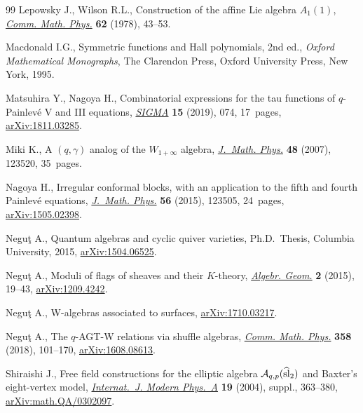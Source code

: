 \documentclass[pdftex]{sigma}
\numberwithin{equation}{section}
\theoremstyle{definition}
\begin{document}
\begin{thebibliography}{99}
Lepowsky J., Wilson R.L., Construction of the affine {L}ie algebra
 {$A_{1}^{{}}(1)$}, \href{https://doi.org/10.1007/BF01940329}{\textit{Comm. Math. Phys.}} \textbf{62} (1978), 43--53.

Macdonald I.G., Symmetric functions and {H}all polynomials, 2nd ed., \textit{Oxford
 Mathematical Monographs}, The Clarendon Press, Oxford University Press, New
 York, 1995.

Matsuhira Y., Nagoya H., Combinatorial expressions for the tau functions of
 {$q$}-{P}ainlev\'e {V} and {III} equations, \href{https://doi.org/10.3842/SIGMA.2019.074}{\textit{SIGMA}} \textbf{15}
 (2019), 074, 17~pages, \href{https://arxiv.org/abs/1811.03285}{arXiv:1811.03285}.

Miki K., A {$(q,\gamma)$} analog of the {$W_{1+\infty}$} algebra,
 \href{https://doi.org/10.1063/1.2823979}{\textit{J.~Math. Phys.}} \textbf{48} (2007), 123520, 35~pages.

Nagoya H., Irregular conformal blocks, with an application to the fifth and
 fourth {P}ainlev\'{e} equations, \href{https://doi.org/10.1063/1.4937760}{\textit{J.~Math. Phys.}} \textbf{56} (2015),
 123505, 24~pages, \href{https://arxiv.org/abs/1505.02398}{arXiv:1505.02398}.

Negu\c{t} A., Quantum algebras and cyclic quiver varieties, Ph.D.~Thesis,
 {C}olumbia University, 2015, \href{https://arxiv.org/abs/1504.06525}{arXiv:1504.06525}.

Negu\c{t} A., Moduli of flags of sheaves and their {$K$}-theory,
 \href{https://doi.org/10.14231/AG-2015-002}{\textit{Algebr. Geom.}} \textbf{2} (2015), 19--43, \href{https://arxiv.org/abs/1209.4242}{arXiv:1209.4242}.

Negu\c{t} A., {W}-algebras associated to surfaces, \href{https://arxiv.org/abs/1710.03217}{arXiv:1710.03217}.

Negu\c{t} A., The {$q$}-{AGT}-{W} relations via shuffle algebras, \href{https://doi.org/10.1007/s00220-018-3102-3}{\textit{Comm.
 Math. Phys.}} \textbf{358} (2018), 101--170, \href{https://arxiv.org/abs/1608.08613}{arXiv:1608.08613}.

Shiraishi J., Free field constructions for the elliptic algebra
 {$\mathcal{A}_{q,p}(\widehat{\rm sl}_2)$} and {B}axter's eight-vertex model,
 \href{https://doi.org/10.1142/S0217751X0402052X}{\textit{Internat.~J. Modern Phys.~A}} \textbf{19} (2004), suppl., 363--380,
 \href{https://arxiv.org/abs/math.QA/0302097}{arXiv:math.QA/0302097}.


\end{thebibliography}
\end{document}
